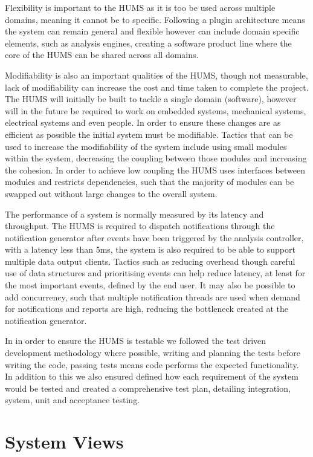 \documentclass[10pt,a4paper]{article}
\begin{document}
Flexibility is important to the HUMS as it is too be used across multiple 
domains, meaning it cannot be to specific. Following a plugin 
architecture means the system can remain general and flexible however 
can include domain specific elements, such as analysis engines, 
creating a software product line where the core of the HUMS can be 
shared across all domains.

Modifiability is also an important qualities of the HUMS, though not 
measurable, lack of modifiability can increase the cost and time taken to 
complete the project. The HUMS will initially be built to tackle a single 
domain (software), however will in the future be required to work on embedded 
systems, mechanical systems, electrical systems and even people. In 
order to ensure these changes are as efficient as possible the initial system 
must be modifiable. Tactics that can be used to increase the modifiability 
of the system include using small modules within the system, decreasing the 
coupling between those modules and increasing the cohesion. In order 
to achieve low coupling  the HUMS uses interfaces between modules and 
restricts dependencies, such that the majority of modules can be 
swapped out without large changes to the overall system.

The performance of a system is normally measured by its latency and 
throughput. The HUMS is required to dispatch notifications through the 
notification generator after events have been triggered by the analysis 
controller, with a latency less than 5ms, the system is 
also required to be able to support multiple data output clients. Tactics 
such as reducing overhead though careful use of data structures and prioritising events can help reduce latency, at least for the most important events, defined by the end user. It may also be possible to add concurrency, such that multiple notification threads are used when demand for notifications and reports are high, reducing the bottleneck created at the notification generator.

In in order to ensure the HUMS is testable we followed the test driven 
development methodology where possible, writing and planning the tests 
before writing the code, passing tests means code performs the 
expected functionality. In addition to this we also ensured defined how 
each requirement of the system would be tested and created a 
comprehensive test plan, detailing integration, system, unit and 
acceptance testing.

\section{System Views}
\label{sec:architecture-views}
\end{document}
